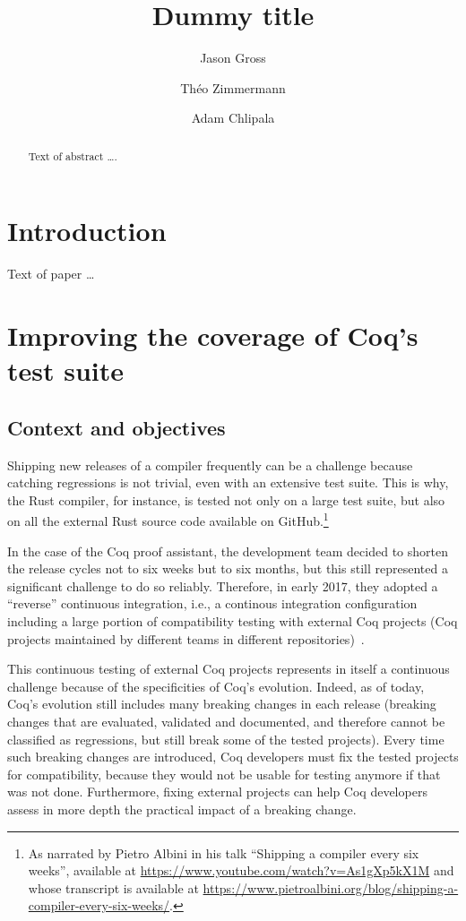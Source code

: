 \documentclass[a4paper,USenglish,cleveref,autoref,thm-restate]{lipics-v2021}
\title{Dummy title} %
\author{Jason Gross}{CSAIL, Massachusetts Institute of Technology, 77 Massachusetts Ave., Cambridge, MA 02139, USA \and MIRI, USA \and \url{https://jasongross.github.io/} }{jgross@mit.edu}{https://orcid.org/0000-0002-9427-4891}{}%
\author{Théo Zimmermann}{Department of Informatics, Dummy College, [optional: Address], Country}{joanrpublic@dummycollege.org}{[orcid]}{[funding]}
\author{Adam Chlipala}{CSAIL, Massachusetts Institute of Technology, 77 Massachusetts Ave., Cambridge, MA 02139, USA \and \url{http://adam.chlipala.net/} }{adamc@csail.mit.edu}{[orcid]}{[funding]}
\begin{document}
\maketitle

\begin{abstract}
Text of abstract \ldots.
\end{abstract}


\section{Introduction}

Text of paper \ldots

\section{Improving the coverage of Coq's test suite}

\subsection{Context and objectives}

Shipping new releases of a compiler frequently can be a challenge
because catching regressions is not trivial, even with an extensive
test suite.
%
This is why, the Rust compiler, for instance, is tested not only on a
large test suite, but also on all the external Rust source code
available on GitHub.\footnote{As narrated by Pietro Albini in his talk
``Shipping a compiler every six weeks'', available at
\url{https://www.youtube.com/watch?v=As1gXp5kX1M} and whose transcript
is available at
\url{https://www.pietroalbini.org/blog/shipping-a-compiler-every-six-weeks/}.}

In the case of the Coq proof assistant, the development team decided
to shorten the release cycles not to six weeks but to six months, but
this still represented a significant challenge to do so reliably.
%
Therefore, in early 2017, they adopted a ``reverse'' continuous
integration, i.e., a continous integration configuration including a
large portion of compatibility testing with external Coq projects (Coq
projects maintained by different teams in different
repositories)~\cite{zimmermann:tel-02451322}.

This continuous testing of external Coq projects represents in itself
a continuous challenge because of the specificities of Coq's
evolution.
%
Indeed, as of today, Coq's evolution still includes many breaking
changes in each release (breaking changes that are evaluated,
validated and documented, and therefore cannot be classified as
regressions, but still break some of the tested projects).
%
Every time such breaking changes are introduced, Coq developers must
fix the tested projects for compatibility, because they would not be
usable for testing anymore if that was not done.
%
Furthermore, fixing external projects can help Coq developers assess
in more depth the practical impact of a breaking change.
\end{document}

